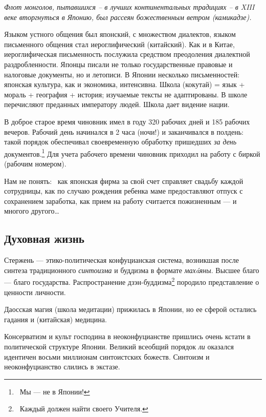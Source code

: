\documentclass[a4paper]{article}
\begin{document}
{\itshape
Флот монголов, пытавшихся – в лучших континентальных традициях – в \foreignlanguage{english}{XIII} веке вторгнуться в
Японию, был рассеян {\textquotedbl}божественным ветром{\textquotedbl} (камикадзе).}

{
Языком устного общения был японский, с множеством диалектов, языком письменного общения стал иероглифический
(китайский). Как и в Китае, иероглифическая письменность послужила средством преодоления диалектной раздробленности.
Японцы писали не только государственные правовые и налоговые документы, но и летописи. В Японии несколько
письменностей: японская культура, как и экономика, интенсивна. Школа (кокутай) = язык + мораль + география + история;
изучаемые тексты не адаптированы. В школе перечисляют преданных императору людей. Школа дает видение нации. }

{
В доброе старое время чиновник имел в году 320 рабочих дней и 185 рабочих вечеров. Рабочий день начинался в 2 часа
(ночи!) и заканчивался в полдень: такой порядок обеспечивал своевременную обработку пришедших \textit{за день}
документов.\footnote{\foreignlanguage{russian}{\ Мы — не в Японии!}} Для учета рабочего времени чиновник приходил на
работу с биркой (рабочим номером). }

{
Нам не понять: \ как японская фирма за свой счет справляет свадьбу каждой сотрудницы, как по случаю рождения ребенка
маме предоставляют отпуск с сохранением заработка, как прием на работу считается пожизненным — и многого другого… }

\subsection[Духовная жизнь]{ Духовная жизнь}
{
Стержень — этико-политическая конфуцианская система, возникшая после синтеза традиционного \textit{синтоизма} и буддизма
в формате \textit{махáяны}. Высшее благо — благо государства. Распространение
дзэн-буддизма\footnote{\foreignlanguage{russian}{\ {\textquotedbl}Каждый должен найти своего Учителя{\textquotedbl}.}}
породило представление о ценности личности. }

{
Даосская магия (школа медитации) прижилась в Японии, но ее сферой остались гадания и (китайская) медицина. }

{
Консерватизм и культ господина в неоконфуцианстве пришлись очень кстати в политической структуре Японии. Великий
всеобщий порядок \textit{ли} оказался идентичен восьми миллионам синтоистских божеств. Синтоизм и неоконфуцианство
{\textquotedbl}слились в экстазе{\textquotedbl}. }
\end{document}
